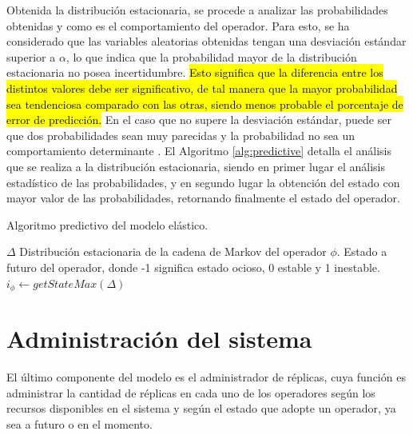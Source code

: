 Obtenida la distribución estacionaria, se procede a analizar las probabilidades obtenidas y como es el comportamiento del operador. Para esto, se ha considerado que las variables aleatorias obtenidas tengan una desviación estándar superior a $\alpha$, lo que indica que la probabilidad mayor de la distribución estacionaria no posea incertidumbre. \hl{Esto significa que la diferencia entre los distintos valores debe ser significativo, de tal manera que la mayor probabilidad sea tendenciosa comparado con las otras, siendo menos probable el porcentaje de error de predicción.} En el caso que no supere la desviación estándar, puede ser que dos probabilidades sean muy parecidas y la probabilidad no sea un comportamiento determinante \citep{soong2004fundamentals}. El Algoritmo \ref{alg:predictive} detalla el análisis que se realiza a la distribución estacionaria, siendo en primer lugar el análisis estadístico de las probabilidades, y en segundo lugar la obtención del estado con mayor valor de las probabilidades, retornando finalmente el estado del operador.

\begin{algorithm}[t]
	\caption{Algoritmo predictivo del modelo elástico.}
	\label{alg:predictive}
	\begin{algorithmic}[1]
	\REQUIRE$\Delta$ Distribución estacionaria de la cadena de Markov del operador $\phi$.
	\ENSURE Estado a futuro del operador, donde -1 significa estado ocioso, 0 estable y 1 inestable.
		\STATE $i_{\phi} \leftarrow getStateMax(\Delta)$ 
	\ENDIF
	
	
	\end{algorithmic}
\end{algorithm}

\section{Administración del sistema}

El último componente del modelo es el administrador de réplicas, cuya función es administrar la cantidad de réplicas en cada uno de los operadores según los recursos disponibles en el sistema y según el estado que adopte un operador, ya sea a futuro o en el momento.


